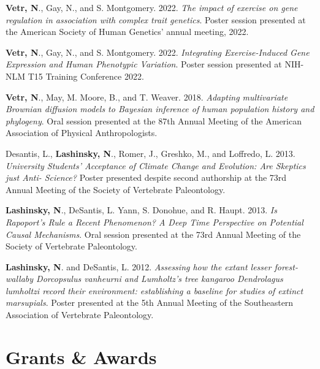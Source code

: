 \documentclass[12pt]{article}
\begin{document}
\begin{enumerate}[label={[\arabic*]}]

\item \textbf{Vetr, N}., Gay, N., and S. Montgomery. 2022. \emph{The impact of exercise on gene regulation in association with complex trait genetics}. Poster session presented at the American Society of Human Genetics' annual meeting, 2022.

\item \textbf{Vetr, N}., Gay, N., and S. Montgomery. 2022. \emph{Integrating Exercise-Induced Gene Expression and Human Phenotypic Variation}. Poster session presented at NIH-NLM T15 Training Conference 2022.

\item \textbf{Vetr, N}., May, M. Moore, B., and T. Weaver. 2018. \emph{Adapting multivariate Brownian diffusion models to Bayesian inference of human population history and phylogeny}. Oral session presented at the 87th Annual Meeting of the American Association of Physical Anthropologists.

\item Desantis, L., \textbf{Lashinsky, N}., Romer, J., Greshko, M., and Loffredo, L. 2013. \emph{University Students' Acceptance of Climate Change and Evolution: Are Skeptics just Anti- Science?} Poster presented despite second authorship at the 73rd Annual Meeting of the Society of Vertebrate Paleontology. 

\item \textbf{Lashinsky, N}., DeSantis, L. Yann, S. Donohue, and R. Haupt. 2013. \emph{Is Rapoport’s Rule a Recent Phenomenon? A Deep Time Perspective on Potential Causal Mechanisms}. Oral session presented at the 73rd Annual Meeting of the Society of Vertebrate Paleontology. 

\item \textbf{Lashinsky, N}. and DeSantis, L. 2012. \emph{Assessing how the extant lesser forest-wallaby Dorcopsulus vanheurni and Lumholtz’s tree kangaroo Dendrolagus lumholtzi record their environment: establishing a baseline for studies of extinct marsupials}. Poster presented at the 5th Annual Meeting of the Southeastern Association of Vertebrate Paleontology. 


\end{enumerate}

\vspace{-0.35em}

\section{Grants \& Awards}
\end{document}
